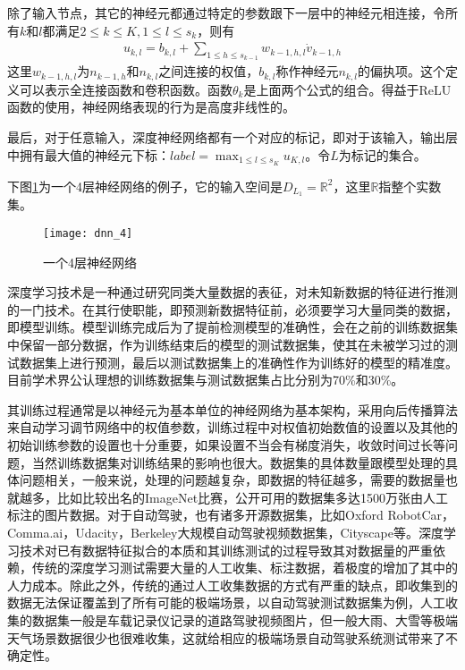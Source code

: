 除了输入节点，其它的神经元都通过特定的参数跟下一层中的神经元相连接，令所有$k$和$l$都满足$2\leq k \leq K, 1\leq l \leq s_k$，则有
\begin{gather}
u_{k,l}=b_{k,l}+\sum_{1\leq h\leq s_{k-1}}w_{k-1,h,l}\dot v_{k-1,h}
\end{gather} 
这里$w_{k-1,h,l}$为$n_{k-1,h}$和$n_{k,l}$之间连接的权值，$b_{k,l}$称作神经元$n_{k,l}$的偏执项。这个定义可以表示全连接函数和卷积函数。函数$\theta_k$是上面两个公式的组合。得益于ReLU函数的使用，神经网络表现的行为是高度非线性的。

最后，对于任意输入，深度神经网络都有一个对应的标记，即对于该输入，输出层中拥有最大值的神经元下标：$label=\max_{1\leq l\leq s_K}u_{K,l}$。令$L$为标记的集合。

下图\ref{fig:dnn}为一个4层神经网络的例子，它的输入空间是$D_{L_1}=\mathbb{R}^2$，这里$\mathbb{R}$指整个实数集。
\begin{figure}[h]
    \centering
    \texttt{[image: dnn\_4]}
    \caption{一个4层神经网络}
    \label{fig:dnn}
\end{figure}

深度学习技术是一种通过研究同类大量数据的表征，对未知新数据的特征进行推测的一门技术。在其行使职能，即预测新数据特征前，必须要学习大量同类的数据，即模型训练。模型训练完成后为了提前检测模型的准确性，会在之前的训练数据集中保留一部分数据，作为训练结束后的模型的测试数据集，使其在未被学习过的测试数据集上进行预测，最后以测试数据集上的准确性作为训练好的模型的精准度。目前学术界公认理想的训练数据集与测试数据集占比分别为70\%和30\%\cite{cs231n}。

其训练过程通常是以神经元为基本单位的神经网络为基本架构，采用向后传播算法来自动学习调节网络中的权值参数，训练过程中对权值初始数值的设置以及其他的初始训练参数的设置也十分重要，如果设置不当会有梯度消失，收敛时间过长等问题，当然训练数据集对训练结果的影响也很大。数据集的具体数量跟模型处理的具体问题相关，一般来说，处理的问题越复杂，即数据的特征越多，需要的数据量也就越多，比如比较出名的ImageNet\cite{ImageNet}比赛，公开可用的数据集多达1500万张由人工标注的图片数据。对于自动驾驶，也有诸多开源数据集，比如Oxford RobotCar\cite{ds:oxford}，Comma.ai\cite{ds:ai}，Udacity\cite{udacity_dataset}，Berkeley大规模自动驾驶视频数据集\cite{ds:berkeley}，Cityscape\cite{Cordts2016Cityscapes}等。深度学习技术对已有数据特征拟合的本质和其训练测试的过程导致其对数据量的严重依赖，传统的深度学习测试需要大量的人工收集、标注数据，着极度的增加了其中的人力成本。除此之外，传统的通过人工收集数据的方式有严重的缺点，即收集到的数据无法保证覆盖到了所有可能的极端场景，以自动驾驶测试数据集为例，人工收集的数据集一般是车载记录仪记录的道路驾驶视频图片，但一般大雨、大雪等极端天气场景数据很少也很难收集，这就给相应的极端场景自动驾驶系统测试带来了不确定性。 

